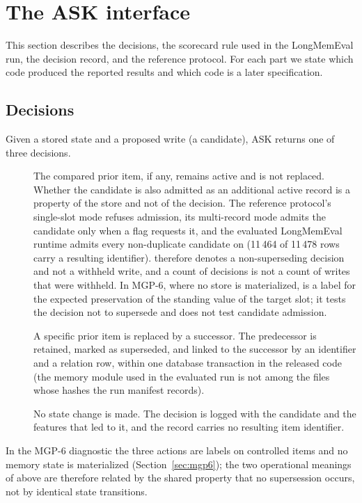 \section{The ASK interface}
\label{sec:interface}
This section describes the decisions, the scorecard rule used in the LongMemEval run, the decision record, and the reference protocol. For each part we state which code produced the reported results and which code is a later specification.

\subsection{Decisions}
Given a stored state and a proposed write (a candidate), ASK returns one of three decisions.
\begin{description}
\item[\keep] The compared prior item, if any, remains active and is not replaced. Whether the candidate is also admitted as an additional active record is a property of the store and not of the decision. The reference protocol's single-slot mode refuses admission, its multi-record mode admits the candidate only when a flag requests it, and the evaluated LongMemEval runtime admits every non-duplicate candidate on \keep{} (11\,464 of 11\,478 \keep{} rows carry a resulting identifier). \keep{} therefore denotes a non-superseding decision and not a withheld write, and a count of \keep{} decisions is not a count of writes that were withheld. In MGP-6, where no store is materialized, \keep{} is a label for the expected preservation of the standing value of the target slot; it tests the decision not to supersede and does not test candidate admission.
\item[\supersede] A specific prior item is replaced by a successor. The predecessor is retained, marked as superseded, and linked to the successor by an identifier and a relation row, within one database transaction in the released code (the memory module used in the evaluated run is not among the files whose hashes the run manifest records).
\item[\abstain] No state change is made. The decision is logged with the candidate and the features that led to it, and the record carries no resulting item identifier.
\end{description}
In the MGP-6 diagnostic the three actions are labels on controlled items and no memory state is materialized (Section~\ref{sec:mgp6}); the two operational meanings of \keep{} above are therefore related by the shared property that no supersession occurs, not by identical state transitions.

